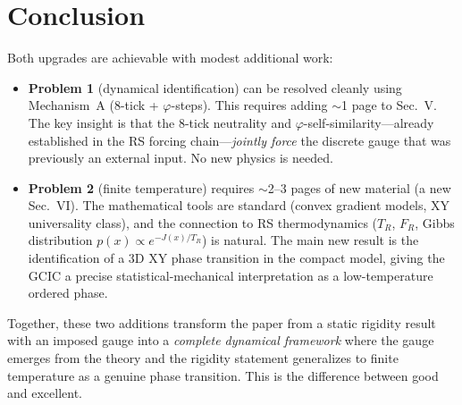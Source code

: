 \documentclass[11pt]{article}
\theoremstyle{definition}
\newcommand{\Jcost}{J}
\newcommand{\TR}{{T_R}}
\newcommand{\FR}{{F_R}}
\newcommand{\phig}{\varphi}
\begin{document}
\section{Conclusion}

Both upgrades are achievable with modest additional work:

\begin{itemize}
\item \textbf{Problem 1} (dynamical identification) can be resolved cleanly using Mechanism~A (8-tick + $\phig$-steps). This requires adding $\sim$1 page to Sec.~V. The key insight is that the 8-tick neutrality and $\phig$-self-similarity---already established in the RS forcing chain---\emph{jointly force} the discrete gauge that was previously an external input. No new physics is needed.

\item \textbf{Problem 2} (finite temperature) requires $\sim$2--3 pages of new material (a new Sec.~VI). The mathematical tools are standard (convex gradient models, XY universality class), and the connection to RS thermodynamics ($\TR$, $\FR$, Gibbs distribution $p(x) \propto e^{-\Jcost(x)/\TR}$) is natural. The main new result is the identification of a 3D XY phase transition in the compact model, giving the GCIC a precise statistical-mechanical interpretation as a low-temperature ordered phase.
\end{itemize}

Together, these two additions transform the paper from a static rigidity result with an imposed gauge into a \emph{complete dynamical framework} where the gauge emerges from the theory and the rigidity statement generalizes to finite temperature as a genuine phase transition. This is the difference between good and excellent.
\end{document}

